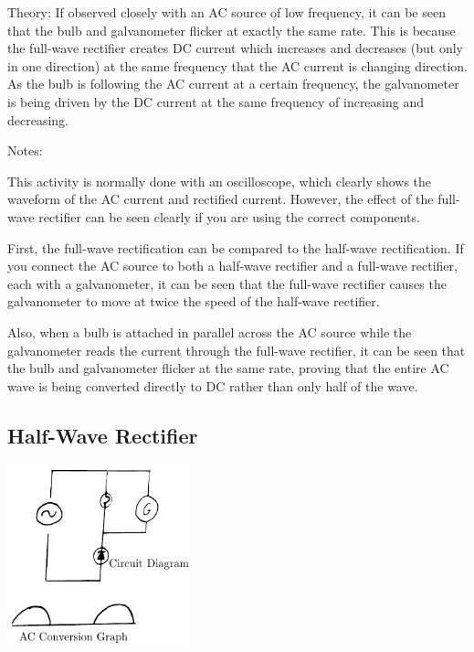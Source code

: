 \begin{multicols}{2}
\begin{description*}
\item[Theory:]{If observed closely with an AC source of low frequency, it can be seen that the bulb and galvanometer flicker at exactly the same rate.  This is because the full-wave rectifier creates DC current which increases and decreases (but only in one direction) at the same frequency that the AC current is changing direction.  As the bulb is following the AC current at a certain frequency, the galvanometer is being driven by the DC current at the same frequency of increasing and decreasing.}
\item[Notes:]{This activity is normally done with an oscilloscope, which clearly shows the waveform of the AC current and rectified current.  However, the effect of the full-wave rectifier can be seen clearly if you are using the correct components.

First, the full-wave rectification can be compared to the half-wave rectification.  If you connect the AC source to both a half-wave rectifier and a full-wave rectifier, each with a galvanometer, it can be seen that the full-wave rectifier causes the galvanometer to move at twice the speed of the half-wave rectifier.

Also, when a bulb is attached in parallel across the AC source while the galvanometer reads the current through the full-wave rectifier, it can be seen that the bulb and galvanometer flicker at the same rate, proving that the entire AC wave is being converted directly to DC rather than only half of the wave.}
\end{description*}

\subsection{Half-Wave Rectifier}

\begin{center}
\includegraphics[width=0.4\textwidth]{./img/half-wave-rectifier.png}
\end{center}


\end{multicols}

